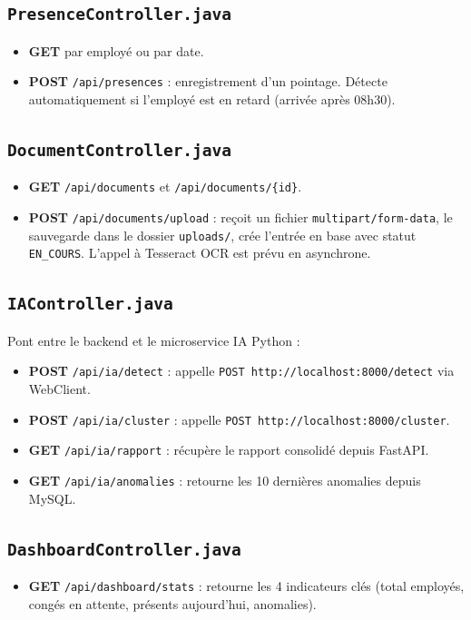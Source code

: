 \documentclass[a4paper,12pt]{report}
\begin{document}
\subsection{\texttt{PresenceController.java}}
\begin{itemize}
  \item \textbf{GET} par employé ou par date.
  \item \textbf{POST} \texttt{/api/presences} : enregistrement d'un pointage. Détecte automatiquement si l'employé est en retard (arrivée après 08h30).
\end{itemize}

\subsection{\texttt{DocumentController.java}}
\begin{itemize}
  \item \textbf{GET} \texttt{/api/documents} et \texttt{/api/documents/\{id\}}.
  \item \textbf{POST} \texttt{/api/documents/upload} : reçoit un fichier \texttt{multipart/form-data}, le sauvegarde dans le dossier \texttt{uploads/}, crée l'entrée en base avec statut \texttt{EN\_COURS}. L'appel à Tesseract OCR est prévu en asynchrone.
\end{itemize}

\subsection{\texttt{IAController.java}}
Pont entre le backend et le microservice IA Python :
\begin{itemize}
  \item \textbf{POST} \texttt{/api/ia/detect} : appelle \texttt{POST http://localhost:8000/detect} via WebClient.
  \item \textbf{POST} \texttt{/api/ia/cluster} : appelle \texttt{POST http://localhost:8000/cluster}.
  \item \textbf{GET} \texttt{/api/ia/rapport} : récupère le rapport consolidé depuis FastAPI.
  \item \textbf{GET} \texttt{/api/ia/anomalies} : retourne les 10 dernières anomalies depuis MySQL.
\end{itemize}

\subsection{\texttt{DashboardController.java}}
\begin{itemize}
  \item \textbf{GET} \texttt{/api/dashboard/stats} : retourne les 4 indicateurs clés (total employés, congés en attente, présents aujourd'hui, anomalies).
\end{itemize}
\end{document}
